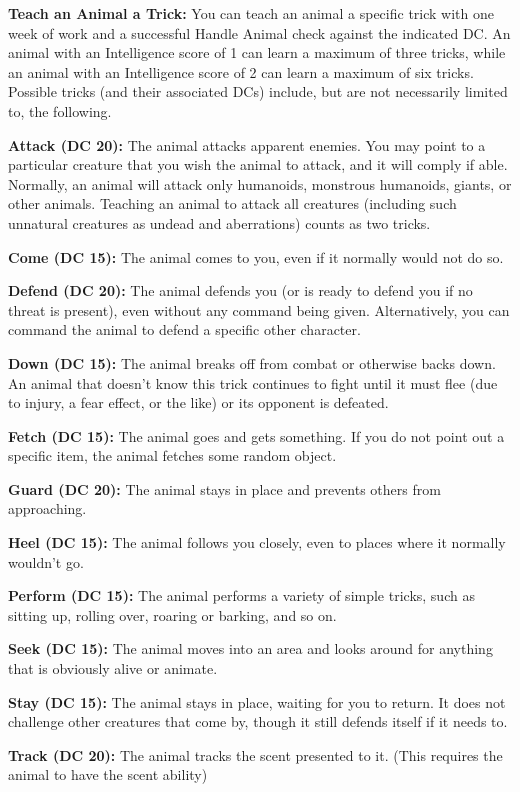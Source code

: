 \textbf{Teach an Animal a Trick:} You can teach an animal a specific trick with one week of work and a successful Handle Animal check against the indicated DC. An animal with an Intelligence score of 1 can learn a maximum of three tricks, while an animal with an Intelligence score of 2 can learn a maximum of six tricks. Possible tricks (and their associated DCs) include, but are not necessarily limited to, the following.

\textbf{Attack (DC 20):} The animal attacks apparent enemies. You may point to a particular creature that you wish the animal to attack, and it will comply if able. Normally, an animal will attack only humanoids, monstrous humanoids, giants, or other animals. Teaching an animal to attack all creatures (including such unnatural creatures as undead and aberrations) counts as two tricks.

\textbf{Come (DC 15):} The animal comes to you, even if it normally would not do so.

\textbf{Defend (DC 20):} The animal defends you (or is ready to defend you if no threat is present), even without any command being given. Alternatively, you can command the animal to defend a specific other character.

\textbf{Down (DC 15):} The animal breaks off from combat or otherwise backs down. An animal that doesn't know this trick continues to fight until it must flee (due to injury, a fear effect, or the like) or its opponent is defeated.

\textbf{Fetch (DC 15):} The animal goes and gets something. If you do not point out a specific item, the animal fetches some random object.

\textbf{Guard (DC 20):} The animal stays in place and prevents others from approaching.

\textbf{Heel (DC 15):} The animal follows you closely, even to places where it normally wouldn't go.

\textbf{Perform (DC 15):} The animal performs a variety of simple tricks, such as sitting up, rolling over, roaring or barking, and so on.

\textbf{Seek (DC 15):} The animal moves into an area and looks around for anything that is obviously alive or animate.

\textbf{Stay (DC 15):} The animal stays in place, waiting for you to return. It does not challenge other creatures that come by, though it still defends itself if it needs to.

\textbf{Track (DC 20):} The animal tracks the scent presented to it. (This requires the animal to have the scent ability)


